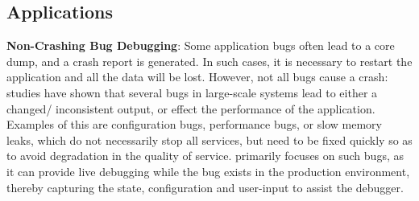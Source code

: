 \subsection{Applications}
\label{sec:impact}



\textbf{Non-Crashing Bug Debugging}: 
 Some application bugs often lead to a core dump, and a crash report is generated. 
 In such cases, it is necessary to restart the application and all the data will be lost.
 However,  not all bugs cause a crash: studies have shown \cite{Zhang:2013:ADS:2486788.2486830, liu2005mining, kremenek2007factor} that several bugs in large-scale systems lead to either a changed/ inconsistent output, or effect the performance of the application.
 Examples of this are configuration bugs, performance bugs, or slow memory leaks, which do not necessarily stop all services, but need to be fixed quickly so as to avoid degradation in the quality of service.
 \parikshan primarily focuses on such bugs, as it can provide live debugging while the bug exists in the production environment, thereby capturing the state, configuration and user-input to assist the debugger.\\

